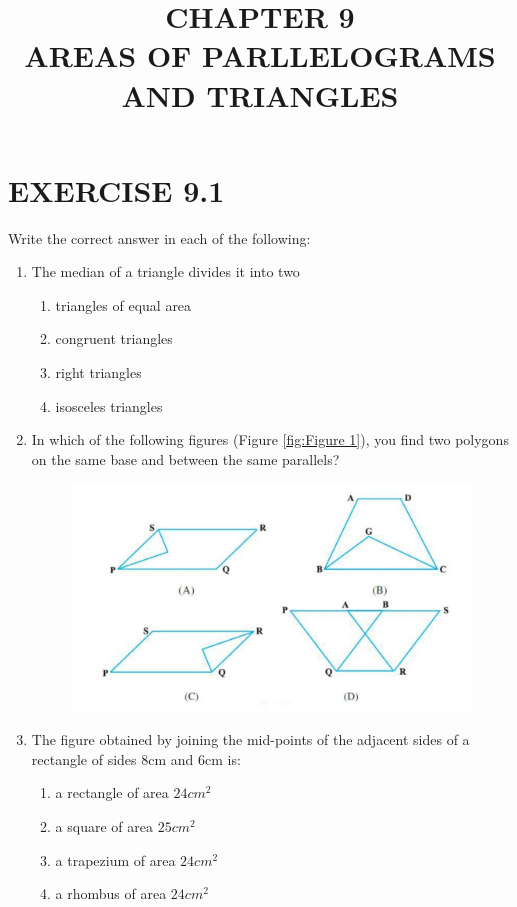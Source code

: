\documentclass{article}
\begin{document}
\title{CHAPTER 9\\AREAS OF PARLLELOGRAMS AND TRIANGLES}
\maketitle
\section*{EXERCISE 9.1}
Write the correct answer in each of the following:
\begin{enumerate}
\item The median of a triangle divides it into two 
\begin{enumerate}[twocol]
\item triangles of equal area
\item congruent triangles
\item right triangles          
\item isosceles triangles
\end{enumerate}
\item In which of the following figures (Figure \eqref{fig:Figure 1}), you find two polygons on the same base and between the same parallels?
\begin{figure}[!h]
\begin{center}
\includegraphics[width=\columnwidth]{three.jpg}
\end{center}
\caption{}
\label{fig:Figure 1}
\end{figure}
\item The figure obtained by joining the mid-points of the adjacent sides of a rectangle of sides 8cm and 6cm is:
\begin{enumerate}[twocol]
\item a rectangle of area $24 cm^2$ 
\item a square of area $25 cm^2$
\item a trapezium of area $24 cm^2$ 
\item a rhombus of area $24 cm^2$
\end{enumerate}


\end{enumerate}
\end{document}
